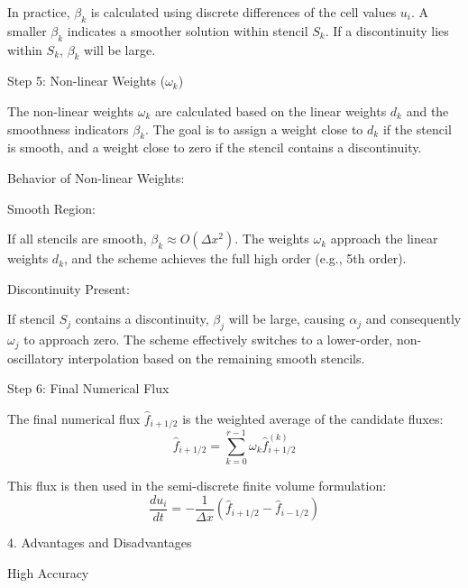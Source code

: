 \documentclass[12pt,a4paper]{article}
\begin{document}
\begin{description}
\begin{description}
In practice, $\beta_k$ is calculated using discrete differences of the cell values $u_i$. A smaller $\beta_k$ indicates a smoother solution within stencil $S_k$. If a discontinuity lies within $S_k$, $\beta_k$ will be large.

\item Step 5: Non-linear Weights ($\omega_k$)

The non-linear weights $\omega_k$ are calculated based on the linear weights $d_k$ and the smoothness indicators $\beta_k$. The goal is to assign a weight close to $d_k$ if the stencil is smooth, and a weight close to zero if the stencil contains a discontinuity.

Behavior of Non-linear Weights:

\begin{description}

\item  Smooth Region: 

If all stencils are smooth, $\beta_k \approx O(\Delta x^2)$. The weights $\omega_k$ approach the linear weights $d_k$, and the scheme achieves the full high order (e.g., 5th order).

\item  Discontinuity Present:

 If stencil $S_j$ contains a discontinuity, $\beta_j$ will be large, causing $\alpha_j$ and consequently $\omega_j$ to approach zero. The scheme effectively switches to a lower-order, non-oscillatory interpolation based on the remaining smooth stencils.

\end{description}

\item Step 6: Final Numerical Flux

The final numerical flux $\hat{f}_{i+1/2}$ is the weighted average of the candidate fluxes:
$$\hat{f}_{i+1/2} = \sum_{k=0}^{r-1} \omega_k \hat{f}_{i+1/2}^{(k)}$$

This flux is then used in the semi-discrete finite volume formulation:
$$\frac{d u_i}{d t} = -\frac{1}{\Delta x} (\hat{f}_{i+1/2} - \hat{f}_{i-1/2})$$

\end{description}

\item 4. Advantages and Disadvantages

\begin{description}

\item High Accuracy


\end{description}
\end{description}
\end{document}
